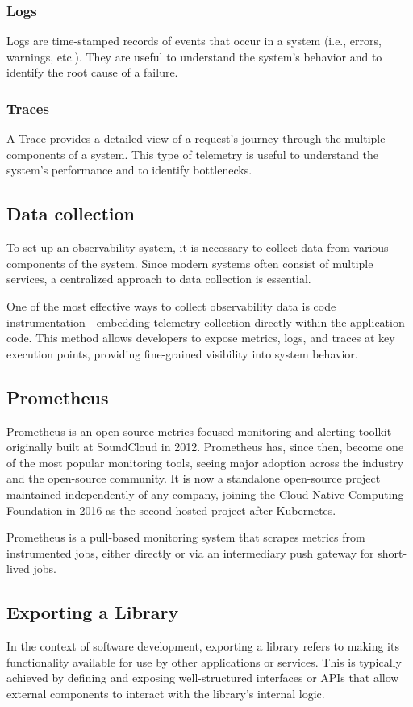 \documentclass[a4paper,twoside,11pt]{article}
\begin{document}
\subsubsection{Logs}
Logs are time-stamped records of events that occur in a system (i.e., errors, warnings, etc.). 
They are useful to understand the system's behavior and to identify the root cause of a failure.

\subsubsection{Traces}
A Trace provides a detailed view of a request's journey through the multiple components of a system.
This type of telemetry is useful to understand the system's performance and to identify bottlenecks.

\subsection{Data collection}
To set up an observability system, it is necessary to collect data from various components of the system. Since modern systems often consist of multiple services, a centralized approach to data collection is essential.


One of the most effective ways to collect observability data is code instrumentation—embedding telemetry collection directly within the application code. 
This method allows developers to expose metrics, logs, and traces at key execution points, providing fine-grained visibility into system behavior.

\subsection{Prometheus}
Prometheus \cite{prometheus:prometheus} is an open-source metrics-focused monitoring and alerting toolkit originally built at SoundCloud in 2012. Prometheus has, since then, become one of the most popular monitoring tools, seeing major adoption across the industry and the open-source community.
It is now a standalone open-source project maintained independently of any company, joining the Cloud Native Computing Foundation in 2016 as the second hosted project after Kubernetes.

Prometheus is a pull-based monitoring system that scrapes metrics from instrumented jobs, either directly or via an intermediary push gateway for short-lived jobs.

\subsection{Exporting a Library}
In the context of software development, exporting a library refers to making its functionality available for use by other applications or services. This is typically achieved by defining and exposing well-structured interfaces or APIs that allow external components to interact with the library's internal logic.
\end{document}
